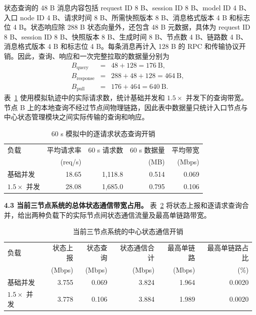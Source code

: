 状态查询的 48 B 消息内容包括 request ID 8 B、session ID 8 B、model ID 4 B、入口 node ID 4 B、请求时间 8 B、所需快照版本 8 B、消息格式版本 4 B 和标志位 4 B。状态响应除 288 B 状态向量外，还包含 48 B 元数据，具体为 request ID 8 B、session ID 8 B、快照版本 8 B、生成时间 8 B、节点数 4 B、链路数 4 B、消息格式版本 4 B 和标志位 4 B。每条消息再计入 128 B 的 RPC 和传输协议开销。因此，查询、响应和一次完整拉取的数据量分别为
\[
\begin{array}{rcl}
B_{\mathrm{query}}
&=&48+128=176\ \mathrm{B},\\
B_{\mathrm{response}}
&=&288+48+128=464\ \mathrm{B},\\
B_{\mathrm{pull}}
&=&176+464=640\ \mathrm{B}.
\end{array}
\]
表~\ref{tab:control-plane-query-results} 使用模拟轨迹中的实际请求数，统计基础并发和 \(1.5\times\) 并发下的查询带宽。节点 B 上的本地查询不经过节点间物理链路，因此表中数据量只统计入口节点与中心状态管理模块之间实际传输的查询和响应。

\begin{table}[H]
\centering
\small
\caption{60 s 模拟中的逐请求状态查询开销}
\label{tab:control-plane-query-results}
\begin{tabular}{@{}lrrrr@{}}
\toprule
负载
& 平均请求率
& 60 s 请求数
& 60 s 数据量
& 平均带宽 \\
& (req/s) & & (MB) & (Mbps) \\
\midrule
基础并发
& 18.65 & 1,118.8 & 0.514 & 0.069 \\
\(1.5\times\) 并发
& 28.08 & 1,685.0 & 0.795 & 0.106 \\
\bottomrule
\end{tabular}
\end{table}

\textbf{4.3 当前三节点系统的总体状态通信带宽占用。}
表~\ref{tab:control-plane-overhead} 将状态上报和逐请求查询合并，给出两种负载下的实际节点间状态通信流量及最高单链路带宽。

\begin{table}[H]
\centering
\small
\caption{当前三节点系统的中心状态通信开销}
\label{tab:control-plane-overhead}
\begin{tabular}{@{}lrrrrr@{}}
\toprule
负载
& 状态上报
& 状态查询
& 状态通信合计
& 最高单链路
& 最高单链路占比 \\
& (Mbps) & (Mbps) & (Mbps) & (Mbps) & (\%) \\
\midrule
基础并发
& 3.755 & 0.069 & 3.824 & 1.964 & 0.0020 \\
\(1.5\times\) 并发
& 3.778 & 0.106 & 3.884 & 1.989 & 0.0020 \\
\bottomrule
\end{tabular}
\end{table}

